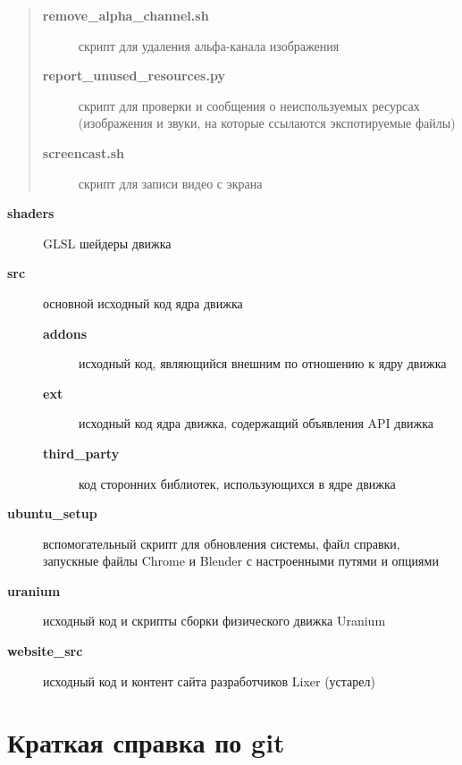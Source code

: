 \documentclass[a4paper,12pt,oneside]{sphinxmanual}
\begin{document}
\begin{quote}
\begin{description}
\item[{\textbf{remove\_alpha\_channel.sh}}] \leavevmode
скрипт для удаления альфа-канала изображения

\item[{\textbf{report\_unused\_resources.py}}] \leavevmode
скрипт для проверки и сообщения о неиспользуемых ресурсах (изображения и
звуки, на которые ссылаются экспотируемые файлы)

\item[{\textbf{screencast.sh}}] \leavevmode
скрипт для записи видео с экрана

\end{description}
\end{quote}
\begin{description}
\item[{\textbf{shaders}}] \leavevmode
GLSL шейдеры движка

\item[{\textbf{src}}] \leavevmode
основной исходный код ядра движка
\begin{description}
\item[{\textbf{addons}}] \leavevmode
исходный код, являющийся внешним по отношению к ядру движка

\item[{\textbf{ext}}] \leavevmode
исходный код ядра движка, содержащий объявления API движка

\item[{\textbf{third\_party}}] \leavevmode
код сторонних библиотек, использующихся в ядре движка

\end{description}

\item[{\textbf{ubuntu\_setup}}] \leavevmode
вспомогательный скрипт для обновления системы, файл справки, запускные файлы Chrome и Blender с настроенными путями и опциями

\item[{\textbf{uranium}}] \leavevmode
исходный код и скрипты сборки физического движка Uranium

\item[{\textbf{website\_src}}] \leavevmode
исходный код и контент сайта разработчиков Lixer (устарел)

\end{description}


\chapter{Краткая справка по git}
\label{git_short_manual:git-short-manual}\label{git_short_manual:index-0}\label{git_short_manual:git}\label{git_short_manual::doc}
\end{document}
